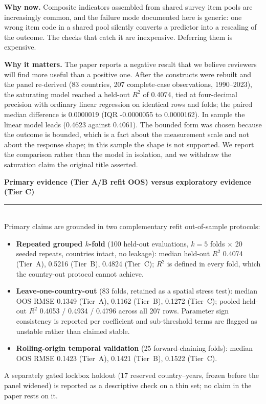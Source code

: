 \documentclass[11pt]{article}
\newcommand{\SubRule}{{\color{black!65}\rule{\linewidth}{0.4pt}}}
\newcommand{\SmallHeading}[1]{\needspace{5\baselineskip}\vspace{0.85em}\noindent\textbf{#1}\\[-0.25em]\SubRule\\[0.45em]}
\begin{document}
\noindent \textbf{Why now.} Composite indicators assembled from shared survey item pools are increasingly common, and the failure mode documented here is generic: one wrong item code in a shared pool silently converts a predictor into a rescaling of the outcome. The checks that catch it are inexpensive. Deferring them is expensive.

\noindent \textbf{Why it matters.} The paper reports a negative result that we believe reviewers will find more useful than a positive one. After the constructs were rebuilt and the panel re-derived (83 countries, 207 complete-case observations, 1990--2023), the saturating model reached a held-out $R^2$ of 0.4074, tied at four-decimal precision with ordinary linear regression on identical rows and folds; the paired median difference is 0.0000019 (IQR -0.0000055 to 0.0000162). In sample the linear model leads (0.4623 against 0.4061). The bounded form was chosen because the outcome is bounded, which is a fact about the measurement scale and not about the response shape; in this sample the shape is not supported. We report the comparison rather than the model in isolation, and we withdraw the saturation claim the original title asserted.

\SmallHeading{Primary evidence (Tier A/B refit OOS) versus exploratory evidence (Tier C)}
\noindent Primary claims are grounded in two complementary refit out-of-sample protocols:
\begin{itemize}
\item \textbf{Repeated grouped $k$-fold} (100 held-out evaluations, $k=5$ folds $\times$ 20 seeded repeats, countries intact, no leakage): median held-out $R^2$ 0.4074 (Tier~A), 0.5216 (Tier~B), 0.4824 (Tier~C); $R^2$ is defined in every fold, which the country-out protocol cannot achieve.
\item \textbf{Leave-one-country-out} (83 folds, retained as a spatial stress test): median OOS RMSE 0.1349 (Tier~A), 0.1162 (Tier~B), 0.1272 (Tier~C); pooled held-out $R^2$ 0.4053 / 0.4934 / 0.4796 across all 207 rows. Parameter sign consistency is reported per coefficient and sub-threshold terms are flagged as unstable rather than claimed stable.
\item \textbf{Rolling-origin temporal validation} (25 forward-chaining folds): median OOS RMSE 0.1423 (Tier~A), 0.1421 (Tier~B), 0.1522 (Tier~C).
\end{itemize}
\noindent A separately gated lockbox holdout (17 reserved country--years, frozen before the panel widened) is reported as a descriptive check on a thin set; no claim in the paper rests on it.
\end{document}
